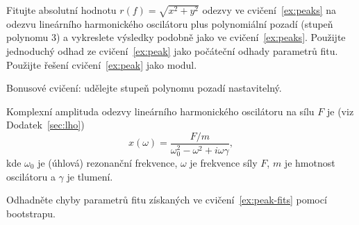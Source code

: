 \begin{exercise}
    \label{ex:peak-fits}
    Fitujte absolutní hodnotu $r(f) = \sqrt{x^2 + y^2}$ odezvy ve cvičení~\ref{ex:peaks} na odezvu lineárního harmonického oscilátoru plus polynomiální pozadí (stupeň polynomu 3) a vykreslete výsledky podobně jako ve cvičení~\ref{ex:peaks}. Použijte jednoduchý odhad ze cvičení~\ref{ex:peak} jako počáteční odhady parametrů fitu. Použijte řešení cvičení~\ref{ex:peak} jako modul.

    Bonusové cvičení: udělejte stupeň polynomu pozadí nastavitelný.

    Komplexní amplituda odezvy lineárního harmonického oscilátoru na sílu $F$ je (viz Dodatek~\ref{sec:lho})
    \begin{equation}
        x(\omega) = \frac{F/m}{\omega_0^2 - \omega^2 + i\omega\gamma},
    \end{equation}
    kde $\omega_0$ je (úhlová) rezonanční frekvence, $\omega$ je frekvence síly $F$, $m$ je hmotnost oscilátoru a $\gamma$ je tlumení.
\end{exercise}
\begin{exercise}
    Odhadněte chyby parametrů fitu získaných ve cvičení~\ref{ex:peak-fits} pomocí bootstrapu.
\end{exercise}



